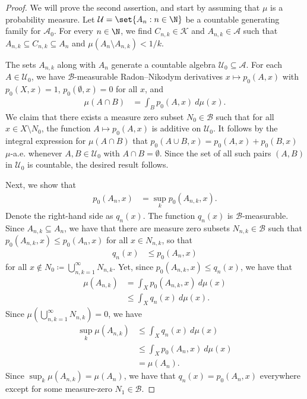 \documentclass[10pt]{mypackage}
\renewcommand{\coloneq}{\coloneqq}
\begin{document}
\begin{proof}
  We will prove the second assertion, and start by assuming that $\mu$ is a probability measure. Let $ \mathcal{U} = \set{A_n : n\in \N}$ be a countable generating family for $ \mathcal{A}_0 $. For every $n\in \N$, we find $C_{n,k}\in \mathcal{K}$ and $A_{n,k}\in \mathcal{A}$ such that $A_{n,k}\subseteq C_{n,k}\subseteq A_n$ and $\mu\left( A_n\setminus A_{n,k} \right) < 1/k$.

  The sets $A_{n,k}$ along with $A_n$ generate a countable algebra $\mathcal{U}_0\subseteq \mathcal{A}$. For each $A\in \mathcal{U}_0$, we have $\mathcal{B}$-measurable Radon--Nikodym derivatives $x\mapsto p_0\left( A,x \right)$ with $p_0\left( X,x \right) = 1$, $p_0\left( \emptyset,x \right) = 0$ for all $x$, and
  \begin{align*}
    \mu\left( A\cap B \right) &= \int_{B}^{} p_0\left( A,x \right)\:d\mu(x).
  \end{align*}
  We claim that there exists a measure zero subset $N_0\in \mathcal{B}$ such that for all $x\in X\setminus N_0$, the function $A\mapsto p_0\left( A,x \right)$ is additive on $\mathcal{U}_0$. It follows by the integral expression for $\mu\left( A\cap B \right)$ that $p_0\left( A\cup B,x \right) = p_0\left( A,x \right) + p_0\left( B,x \right)$ $\mu$-a.e. whenever $A,B\in \mathcal{U}_0$ with $A\cap B = \emptyset$. Since the set of all such pairs $\left( A,B \right)$ in $\mathcal{U}_0$ is countable, the desired result follows.

  Next, we show that
  \begin{align*}
    p_0\left( A_n,x \right) &= \sup_{k}p_0\left( A_{n,k},x \right).
  \end{align*}
  Denote the right-hand side as $q_n(x)$. The function $q_n(x)$ is $\mathcal{B}$-measurable. Since $A_{n,k}\subseteq A_n$, we have that there are measure zero subsets $N_{n,k}\in \mathcal{B}$ such that $p_0\left( A_{n,k},x \right)\leq p_0\left( A_n,x \right)$ for all $x\in N_{n,k}$, so that
  \begin{align*}
    q_n(x) &\leq p_0\left( A_n,x \right)
  \end{align*}
  for all $x\notin N_0\coloneq \bigcup_{n,k=1}^{\infty}N_{n,k}$. Yet, since $p_0\left( A_{n,k},x \right)\leq q_n(x)$, we have that
  \begin{align*}
    \mu\left( A_{n,k} \right) &= \int_{X}^{} p_0\left( A_{n,k},x \right)\:d\mu(x)\\
                              &\leq \int_{X}^{} q_n(x)\:d\mu(x).
  \end{align*}
  Since $\mu\left( \bigcup_{n,k=1}^{\infty}N_{n,k} \right) = 0$, we have
  \begin{align*}
    \sup_{k}\mu\left( A_{n,k} \right) &\leq \int_{X}^{} q_n(x)\:d\mu(x)\\
                                      &\leq \int_{X}^{} p_0\left( A_n,x \right)\:d\mu(x)\\
                                      &= \mu\left( A_n \right).
  \end{align*}
  Since $\sup_{k}\mu\left( A_{n,k} \right) = \mu\left( A_n \right)$, we have that $ q_n(x) = p_0\left( A_n,x \right) $ everywhere except for some measure-zero $N_1\in \mathcal{B}$.


\end{proof}
\end{document}
